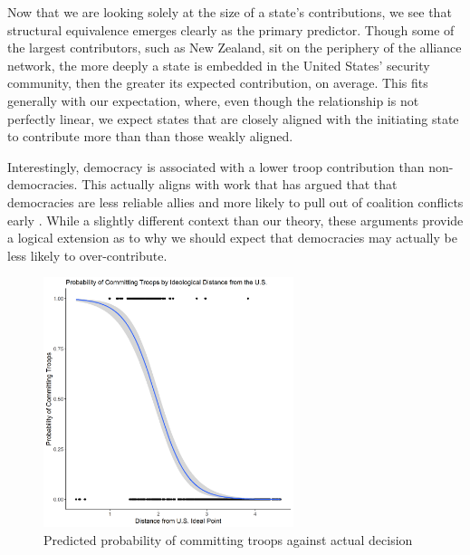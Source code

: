 \documentclass[12pt,letterpaper]{article}
\begin{document}
	Now that we are looking solely at the size of a state's contributions, we see that structural equivalence emerges clearly as the primary predictor. Though some of the largest contributors, such as New Zealand, sit on the periphery of the alliance network, the more deeply a state is embedded in the United States' security community, then the greater its expected contribution, on average. This fits generally with our expectation, where, even though the relationship is not perfectly linear, we expect states that are closely aligned with the initiating state to contribute more than than those weakly aligned.

	Interestingly, democracy is associated with a lower troop contribution than non-democracies. This actually aligns with work that has argued that that democracies are less reliable allies and more likely to pull out of coalition conflicts early \citep{massie_whydemocraticallies_2016, gartzke_whydemocraciesmay_2004}. While a slightly different context than our theory, these arguments provide a logical extension as to why we should expect that democracies may actually be less likely to over-contribute.
	
	\begin{figure}[H]
		\centering
		\includegraphics[width=0.65\textwidth]{figures/logit.png}
		\caption{Predicted probability of committing troops against actual decision}
		\label{fig:logit}
	\end{figure}
\end{document}
